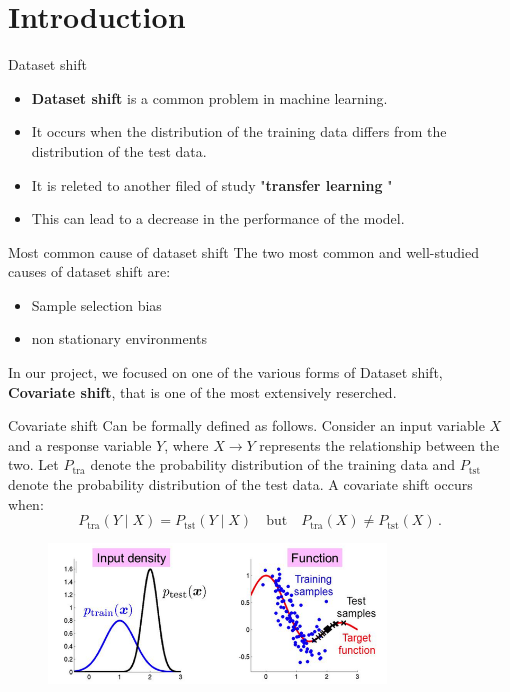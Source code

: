 \section{Introduction}

\begin{frame}{Dataset shift}
\begin{itemize}
    \item \textbf{Dataset shift} is a common problem in machine learning.
    
    \item It occurs when the distribution of the training data differs from the distribution of the test data.
    
    \item It is releted to another filed of study "\textbf{transfer learning} "
    
    \item This can lead to a decrease in the performance of the model.
 \end{itemize}
\end{frame}

\begin{frame}{Most common cause of dataset shift}
The two most common and well-studied causes of dataset shift are:
\begin{itemize}
	\item Sample selection bias
		
	\item non stationary environments
\end{itemize}
\vspace{0.8cm}
In our project, we focused on one of the various forms of Dataset shift, \textbf{Covariate shift}, that is  one of the most extensively reserched.
\end{frame}

\begin{frame}{Covariate shift}
Can be formally defined as follows. Consider an input variable \( X \) and a response variable \( Y \), where \( X \to Y \) represents the relationship between the two. Let \( P_{\text{tra}} \) denote the probability distribution of the training data and \( P_{\text{tst}} \) denote the probability distribution of the test data. A covariate shift occurs when:  
\[
P_{\text{tra}}(Y \mid X) = P_{\text{tst}}(Y \mid X) \quad \text{but} \quad P_{\text{tra}}(X) \neq P_{\text{tst}}(X)\,.
\]
\begin{figure}[H]
	\centering
	\includegraphics[width=0.8\textwidth]{../assets/immagine.png} 
    \label{fig:covariate-shift}
\end{figure}
\end{frame}

